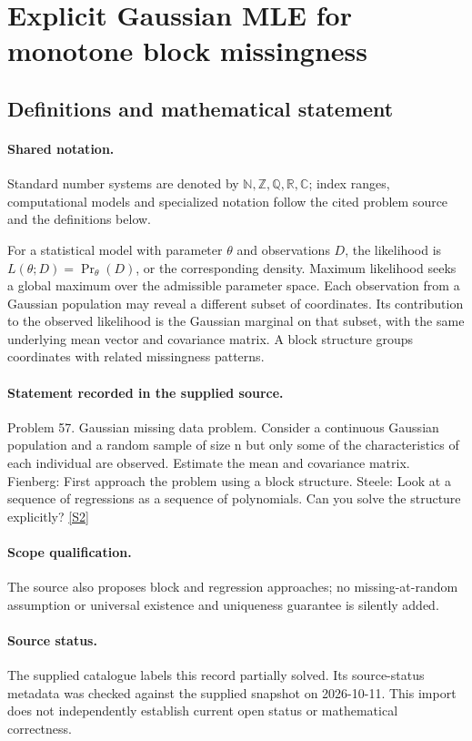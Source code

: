 \documentclass[11pt]{article}
\newcommand{\sref}[2]{\hyperlink{source:#1:#2}{[S#2]}}
\begin{document}
\section{Explicit Gaussian MLE for monotone block missingness}\label{statement}

\subsection{Definitions and mathematical statement}

\paragraph{Shared notation.}Standard number systems are denoted by $\mathbb N,\mathbb Z,\mathbb Q,\mathbb R,\mathbb C$; index ranges, computational models and specialized notation follow the cited problem source and the definitions below.


For a statistical model with parameter $\theta$ and observations $D$, the likelihood is $L(\theta;D)=\Pr_\theta(D)$, or the corresponding density. Maximum likelihood seeks a global maximum over the admissible parameter space. Each observation from a Gaussian population may reveal a different subset of coordinates. Its contribution to the observed likelihood is the Gaussian marginal on that subset, with the same underlying mean vector and covariance matrix. A block structure groups coordinates with related missingness patterns.
\paragraph{Statement recorded in the supplied source.}
Problem 57. Gaussian missing data problem. Consider a continuous Gaussian population and a random sample of size n but only some of the characteristics of each individual are observed. Estimate the mean and covariance matrix. Fienberg: First approach the problem using a block structure. Steele: Look at a sequence of regressions as a sequence of polynomials. Can you solve the structure explicitly? \sref{statement}{2}
\paragraph{Scope qualification.}
The source also proposes block and regression approaches; no missing-at-random assumption or universal existence and uniqueness guarantee is silently added.
\paragraph{Source status.}
The supplied catalogue labels this record partially solved. Its source-status metadata was checked against the supplied snapshot on 2026-10-11. This import does not independently establish current open status or mathematical correctness.
\end{document}
